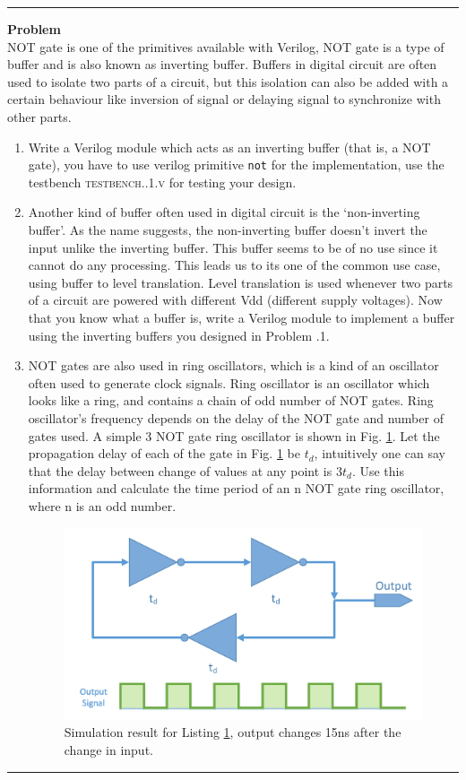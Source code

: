 \documentclass[a4paper,10pt]{article}
\newcommand{\ano}{\text{2}}
\theoremstyle{mytheor}
\newcounter{problemNumber}
\newcommand {
  \insertProblem}[1]{
  \vspace{0.5cm}
  \hrule
  \vspace{0.3cm}

  {\color{greatblue}\textbf{\large{Problem \theproblemNumber}}}
  \vspace{2pt}\\#1

  \addtocounter{problemNumber}{1}
  \vspace{0.2cm}
  \hrule  
  \vspace{0.5cm}
}
\begin{document}
\insertProblem { NOT gate is one of the primitives available with
  Verilog, NOT gate is a type of buffer and is also known as inverting
  buffer. Buffers in digital circuit are often used to isolate two
  parts of a circuit, but this isolation can also be added with a
  certain behaviour like inversion of signal or delaying signal to
  synchronize with other parts.
  
  \begin {enumerate}
  \item Write a Verilog module which acts as an inverting buffer (that
    is, a NOT gate), you have to use verilog primitive
    \lstinline[style=verilog-inline-style]{not} for the
    implementation, use the testbench
    \textsc{testbench{\ano}.{\theproblemNumber}.1.v} for testing your
    design.
  \item Another kind of buffer often used in digital circuit is the
    `non-inverting buffer'. As the name suggests, the non-inverting
    buffer doesn't invert the input unlike the inverting buffer. This
    buffer seems to be of no use since it cannot do any
    processing. This leads us to its one of the common use case, using
    buffer to level translation. Level translation is used whenever
    two parts of a circuit are powered with different Vdd (different
    supply voltages). Now that you know what a buffer is, write a
    Verilog module to implement a buffer using the inverting buffers
    you designed in Problem {\theproblemNumber}.1.
  \item NOT gates are also used in ring oscillators, which is a kind
    of an oscillator often used to generate clock signals. Ring
    oscillator is an oscillator which looks like a ring, and contains
    a chain of odd number of NOT gates. Ring oscillator's frequency
    depends on the delay of the NOT gate and number of gates used. A
    simple 3 NOT gate ring oscillator is shown in
    Fig. \ref{ring-oscillator}. Let the propagation delay of each of
    the gate in Fig. \ref{ring-oscillator} be $t_d$, intuitively one
    can say that the delay between change of values at any point is
    $3t_d$. Use this information and calculate the time period of an n
    NOT gate ring oscillator, where n is an odd number.

    \begin{figure}[!h] \centering  
      \includegraphics[width=0.5\linewidth]{./resources/ringOscillator.pdf}
      \caption{Simulation result for Listing \ref{ring-oscillator}, output changes 15ns after the change in input.} 
      \label{ring-oscillator}
    \end{figure}


\end{enumerate}}
\end{document}
